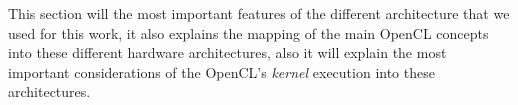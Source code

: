\par{This section will the most important features of the different architecture that we used for this work, it also explains the 
    mapping of the main OpenCL concepts into these different hardware architectures, also it will explain the most important 
    considerations of the OpenCL's \emph{kernel} execution into these architectures}.
